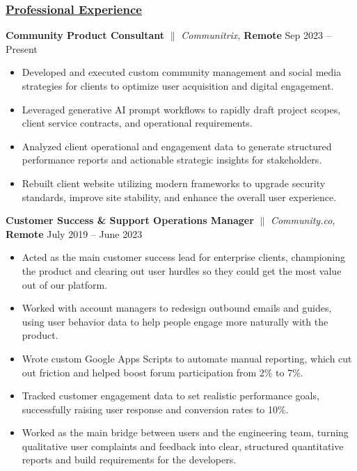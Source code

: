 \documentclass[a4paper,10pt]{article}
\begin{document}
\subsubsection{\underline{Professional Experience}}
{\textbf{Community Product Consultant} $\parallel$ \textit{Communitrix,}  \textbf{Remote} \hfill {Sep 2023 – Present}}
\begin{itemize}
      \item Developed and executed custom community management and social media strategies for clients to optimize user acquisition and digital engagement.
      \item Leveraged generative AI prompt workflows to rapidly draft project scopes, client service contracts, and operational requirements.
      \item Analyzed client operational and engagement data to generate structured performance reports and actionable strategic insights for stakeholders.
      \item Rebuilt client website utilizing modern frameworks to upgrade security standards, improve site stability, and enhance the overall user experience.
\end{itemize}
\vspace{1.5mm}
{\textbf{Customer Success \& Support Operations Manager} $\parallel$ \textit{Community.co,}  \textbf{Remote} \hfill {July 2019 – June 2023}}
\begin{itemize}
      \item Acted as the main customer success lead for enterprise clients, championing the product and clearing out user hurdles so they could get the most value out of our platform.
      \item Worked with account managers to redesign outbound emails and guides, using user behavior data to help people engage more naturally with the product.
      \item Wrote custom Google Apps Scripts to automate manual reporting, which cut out friction and helped boost forum participation from 2\% to 7\%.
      \item Tracked customer engagement data to set realistic performance goals, successfully raising user response and conversion rates to 10\%.
      \item Worked as the main bridge between users and the engineering team, turning qualitative user complaints and feedback into clear, structured quantitative reports and build requirements for the developers.
\end{itemize}
\vspace{1.5mm}
\end{document}
